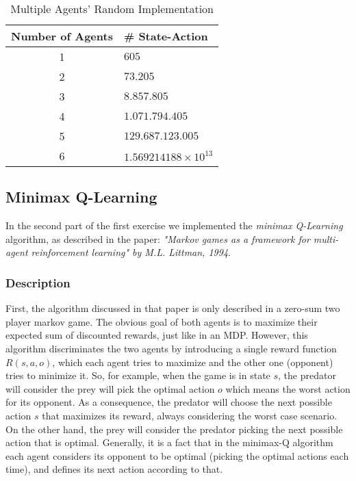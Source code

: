 \documentclass[a4paper,11pt]{article}
\begin{document}
\begin{table}[h]
\begin{center}
\caption{Multiple Agents' Random Implementation}
\begin{tabular}{c l} 
\hline\hline               
\textbf{\small{Number of Agents}} & \textbf{\small{\# State-Action}} \\  
\hline
1 & $605$\\ 
2 & $73.205$\\
3 & $8.857.805$\\
4 & $1.071.794.405$\\
5 & $129.687.123.005$\\
6 & $1.569214188 \times 10^{13}$\\
\end{tabular}
\label{table:complexity} 
\end{center} 
\end{table} 




\subsection{Minimax Q-Learning}

In the second part of the first exercise we implemented the \textit{minimax Q-Learning} algorithm, as described in the paper: \textit{"Markov games as a framework for multi-agent reinforcement learning" by M.L. Littman, 1994}.

\subsubsection{Description}
First, the algorithm discussed in that paper is only described in a zero-sum two player markov game. The obvious goal of both agents is to maximize their expected sum of discounted rewards, just like in an MDP. However, this algorithm discriminates the two agents by introducing a single reward function $R(s,a,o)$, which each agent tries to maximize and the other one (opponent) tries to minimize it. So, for example, when the game is in state $s$, the predator will consider the prey will pick the optimal action $o$ which means the worst action for its opponent. As a consequence, the predator will choose the next possible action $s$ that maximizes its reward, always considering the worst case scenario. On the other hand, the prey will consider the predator picking the next possible action that is optimal. Generally, it is a fact that in the minimax-Q algorithm each agent considers its opponent to be optimal (picking the optimal actions each time), and defines its next action according to that. 
\end{document}
